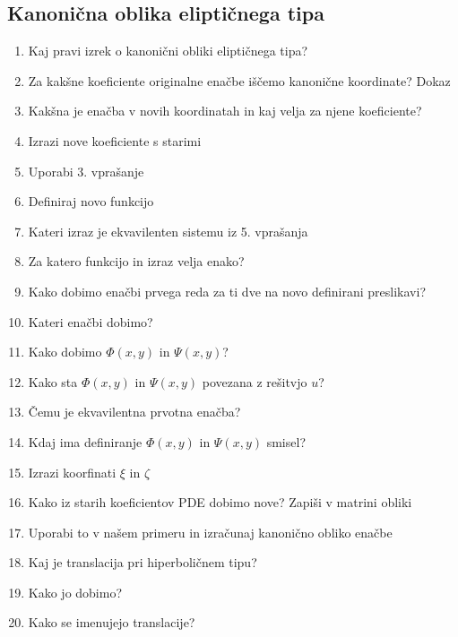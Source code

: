 \documentclass{article}
\begin{document}
    \subsection{Kanonična oblika eliptičnega tipa}
    \begin{enumerate}
        \item Kaj pravi izrek o kanonični obliki eliptičnega tipa?
        \item Za kakšne koeficiente originalne enačbe iščemo kanonične koordinate?
        Dokaz
        \item Kakšna je enačba v novih koordinatah in kaj velja za njene koeficiente?
        \item Izrazi nove koeficiente s starimi
        \item Uporabi 3. vprašanje
        \item Definiraj novo funkcijo
        \item Kateri izraz je ekvavilenten sistemu iz 5. vprašanja
        \item Za katero funkcijo in izraz velja enako?
        \item Kako dobimo enačbi prvega reda za ti dve na novo definirani preslikavi?
        \item Kateri enačbi dobimo?
        \item Kako dobimo $\Phi(x, y)$ in $\Psi(x ,y)$?
        \item Kako sta $\Phi(x, y)$ in $\Psi(x ,y)$ povezana z rešitvjo $u$?
        \item Čemu je ekvavilentna prvotna enačba?
        \item Kdaj ima definiranje $\Phi(x, y)$ in $\Psi(x ,y)$ smisel?
        \item Izrazi koorfinati $\xi$ in $\zeta$
        \item Kako iz starih koeficientov PDE dobimo nove? Zapiši v matrini obliki
        \item Uporabi to v našem primeru in izračunaj kanonično obliko enačbe
        \item Kaj je translacija pri hiperboličnem tipu?
        \item Kako jo dobimo?
        \item Kako se imenujejo translacije?
    \end{enumerate}
\end{document}
